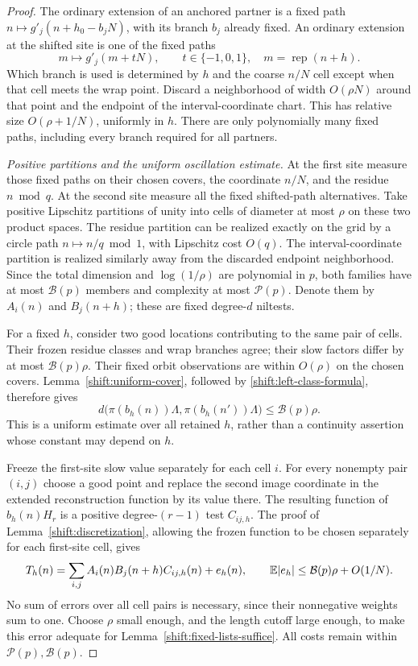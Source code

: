 \begin{proof}
The ordinary extension of an anchored partner is a fixed path
$n\mapsto g'_j(n+h_0-b_jN)$, with its branch $b_j$ already fixed.
An ordinary extension at the shifted site is one of the fixed
paths
\[
 m\longmapsto g'_j(m+tN),\qquad t\in\{-1,0,1\},
 \quad m=\operatorname{rep}(n+h).
\]
Which branch is used is determined by $h$ and the coarse
$n/N$ cell except when that cell meets the wrap point.
Discard a neighborhood of width $O(\rho N)$ around that point
and the endpoint of the interval-coordinate chart.  This has
relative size $O(\rho+1/N)$, uniformly in $h$.
There are only polynomially many fixed paths, including every
branch required for all partners.

\emph{Positive partitions and the uniform oscillation estimate.}
At the first site measure those fixed paths on their chosen
covers, the coordinate $n/N$, and the residue $n\bmod q$.
At the second site measure all the fixed shifted-path alternatives.
Take positive Lipschitz partitions of unity into cells of
diameter at most $\rho$ on these two product spaces.
The residue partition can be realized exactly on the grid by a
circle path $n\mapsto n/q\bmod1$, with Lipschitz cost $O(q)$.
The interval-coordinate partition is realized similarly away from
the discarded endpoint neighborhood.
Since the total dimension and $\log(1/\rho)$ are polynomial in
$p$, both families have at most $\mathcal B(p)$ members and
complexity at most $\mathcal P(p)$.  Denote them by $A_i(n)$
and $B_j(n+h)$; these are fixed degree-$d$ niltests.

For a fixed $h$, consider two good locations contributing to the
same pair of cells.  Their frozen residue classes and wrap branches
agree; their slow factors differ by at most
$\mathcal B(p)\rho$.  Their fixed orbit observations are within
$O(\rho)$ on the chosen covers.
Lemma~\ref{shift:uniform-cover}, followed by
\eqref{shift:left-class-formula}, therefore gives
\begin{equation}\label{shift:uniform-oscillation}
 d\bigl(\pi(b_h(n))\Lambda,\pi(b_h(n'))\Lambda\bigr)
 \leq\mathcal B(p)\rho.
\end{equation}
This is a uniform estimate over all retained $h$, rather than
a continuity assertion whose constant may depend on $h$.

Freeze the first-site slow value separately for each cell $i$.
For every nonempty pair $(i,j)$ choose a good point and replace
the second image coordinate in the extended reconstruction
function by its value there.  The resulting function of
$b_h(n)H_r$ is a positive degree-$(r-1)$ test $C_{ij,h}$.
The proof of Lemma~\ref{shift:discretization}, allowing the
frozen function to be chosen separately for each first-site cell,
gives
\[
 T_h(n)=\sum_{i,j}A_i(n)B_j(n+h)C_{ij,h}(n)+e_h(n),
 \qquad \mathbb E|e_h|\leq\mathcal B(p)\rho+O(1/N).
\]
No sum of errors over all cell pairs is necessary, since their
nonnegative weights sum to one.
Choose $\rho$ small enough, and the length cutoff large enough,
to make this error adequate for Lemma~\ref{shift:fixed-lists-suffice}.
All costs remain within $\mathcal P(p),\mathcal B(p)$.


\end{proof}
